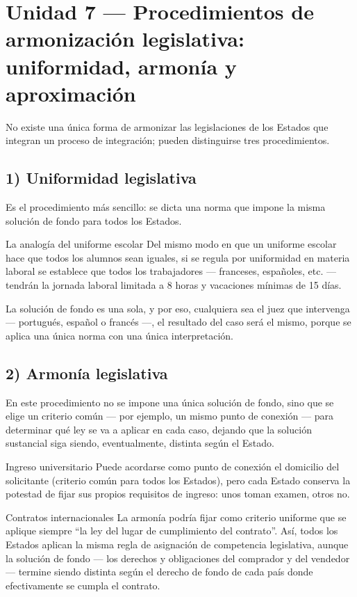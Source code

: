 \documentclass[12pt,oneside]{book}
\begin{document}
\section{Unidad 7 --- Procedimientos de armonización legislativa: uniformidad, armonía y aproximación}

No existe una única forma de armonizar las legislaciones de los Estados que integran un proceso de integración; pueden distinguirse tres procedimientos.

\subsection*{1) Uniformidad legislativa}

Es el procedimiento más sencillo: se dicta una norma que impone la misma solución de fondo para todos los Estados.

\begin{example}{La analogía del uniforme escolar}
Del mismo modo en que un uniforme escolar hace que todos los alumnos sean iguales, si se regula por uniformidad en materia laboral se establece que todos los trabajadores --- franceses, españoles, etc. --- tendrán la jornada laboral limitada a 8 horas y vacaciones mínimas de 15 días.
\end{example}

La solución de fondo es una sola, y por eso, cualquiera sea el juez que intervenga --- portugués, español o francés ---, el resultado del caso será el mismo, porque se aplica una única norma con una única interpretación.

\subsection*{2) Armonía legislativa}

En este procedimiento no se impone una única solución de fondo, sino que se elige un criterio común --- por ejemplo, un mismo punto de conexión --- para determinar qué ley se va a aplicar en cada caso, dejando que la solución sustancial siga siendo, eventualmente, distinta según el Estado.

\begin{example}{Ingreso universitario}
Puede acordarse como punto de conexión el domicilio del solicitante (criterio común para todos los Estados), pero cada Estado conserva la potestad de fijar sus propios requisitos de ingreso: unos toman examen, otros no.
\end{example}

\begin{example}{Contratos internacionales}
La armonía podría fijar como criterio uniforme que se aplique siempre ``la ley del lugar de cumplimiento del contrato''. Así, todos los Estados aplican la misma regla de asignación de competencia legislativa, aunque la solución de fondo --- los derechos y obligaciones del comprador y del vendedor --- termine siendo distinta según el derecho de fondo de cada país donde efectivamente se cumpla el contrato.
\end{example}
\end{document}

